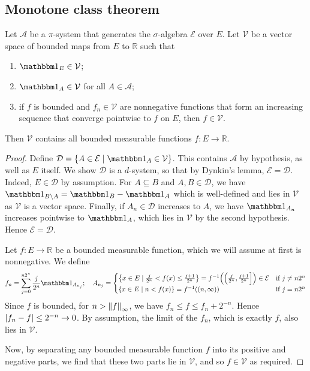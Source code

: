 \subsection{Monotone class theorem}
\begin{theorem}
	Let \( \mathcal A \) be a \( \pi \)-system that generates the \( \sigma \)-algebra \( \mathcal E \) over \( E \).
	Let \( \mathcal V \) be a vector space of bounded maps from \( E \) to \( \mathbb R \) such that
	\begin{enumerate}
		\item \( \mathbbm 1_E \in \mathcal V \);
		\item \( \mathbbm 1_A \in \mathcal V \) for all \( A \in \mathcal A \);
		\item if \( f \) is bounded and \( f_n \in \mathcal V \) are nonnegative functions that form an increasing sequence that converge pointwise to \( f \) on \( E \), then \( f \in \mathcal V \).
	\end{enumerate}
	Then \( \mathcal V \) contains all bounded measurable functions \( f \colon E \to \mathbb R \).
\end{theorem}
\begin{proof}
	Define \( \mathcal D = \qty{A \in \mathcal E \mid \mathbbm 1_A \in \mathcal V} \).
	This contains \( \mathcal A \) by hypothesis, as well as \( E \) itself.
	We show \( \mathcal D \) is a \( d \)-system, so that by Dynkin's lemma, \( \mathcal E = \mathcal D \).
	Indeed, \( E \in \mathcal D \) by assumption.
	For \( A \subseteq B \) and \( A, B \in \mathcal D \), we have \( \mathbbm 1_{B \setminus A} = \mathbbm 1_B - \mathbbm 1_A \) which is well-defined and lies in \( \mathcal V \) as \( \mathcal V \) is a vector space.
	Finally, if \( A_n \in \mathcal D \) increases to \( A \), we have \( \mathbbm 1_{A_n} \) increases pointwise to \( \mathbbm 1_A \), which lies in \( \mathcal V \) by the second hypothesis.
	Hence \( \mathcal E = \mathcal D \).

	Let \( f \colon E \to \mathbb R \) be a bounded measurable function, which we will assume at first is nonnegative.
	We define
	\[ f_n = \sum_{j=0}^{n2^n} \frac{j}{2^n} \mathbbm 1_{A_{n_j}};\quad A_{n_j} = \begin{cases}
		\qty{x \in E \mid \frac{j}{2^n} < f(x) \leq \frac{j+1}{2^n}} = f^{-1}\Big(\Big(\frac{j}{2^n}, \frac{j+1}{2^n}\Big]\Big) \in \mathcal E & \text{if } j \neq n2^n \\
		\qty{x \in E \mid n < f(x)} = f^{-1}((n,\infty)) & \text{if } j = n2^n
	\end{cases} \]
	Since \( f \) is bounded, for \( n > \norm{f}_{\infty} \), we have \( f_n \leq f \leq f_n + 2^{-n} \).
	Hence \( \abs{f_n - f} \leq 2^{-n} \to 0 \).
	By assumption, the limit of the \( f_n \), which is exactly \( f \), also lies in \( \mathcal V \).

	Now, by separating any bounded measurable function \( f \) into its positive and negative parts, we find that these two parts lie in \( \mathcal V \), and so \( f \in \mathcal V \) as required.
\end{proof}

